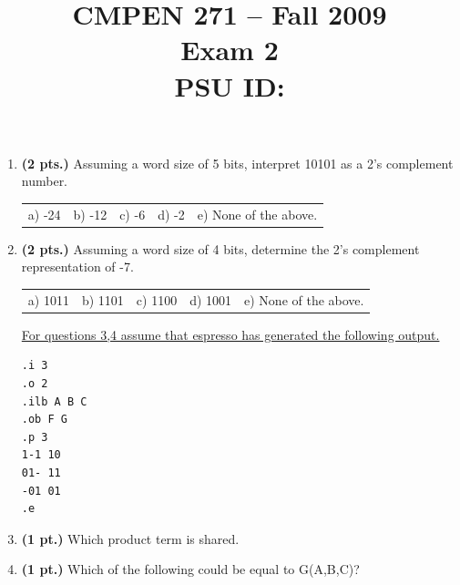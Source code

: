 \documentclass{article}
\begin{document}
\newcommand{\bs}{\backslash}

\title{
\Large{CMPEN 271 -- Fall 2009}\\
\normalsize{Exam 2}\\
PSU ID:}
\date{}

\maketitle{}


\begin{enumerate}
\item {\bf (2 pts.)} Assuming a word size of 5 bits, interpret 10101 as a 2's complement number.

\begin{tabular}{p{0.6in} p{0.6in} p{0.6in} p{0.6in} l}
a) -24 & b) -12 & c) -6 & d) -2 & e) None of the above.
\end{tabular}

\item {\bf (2 pts.)} Assuming a word size of 4 bits, determine the 2's complement
representation of -7.

\begin{tabular}{p{0.6in} p{0.6in} p{0.6in} p{0.6in} l}
a) 1011 & b) 1101 & c) 1100 & d) 1001 & e) None of the above.
\end{tabular}


\underline{For questions 3,4 assume that espresso has generated the following output.}
\begin{verbatim}
.i 3
.o 2
.ilb A B C
.ob F G
.p 3
1-1 10
01- 11
-01 01
.e
\end{verbatim}

\item{\bf (1 pt.)}  Which product term is shared.


\item{\bf (1 pt.)}  Which of the following could be equal to G(A,B,C)?


\end{enumerate}
\end{document}
